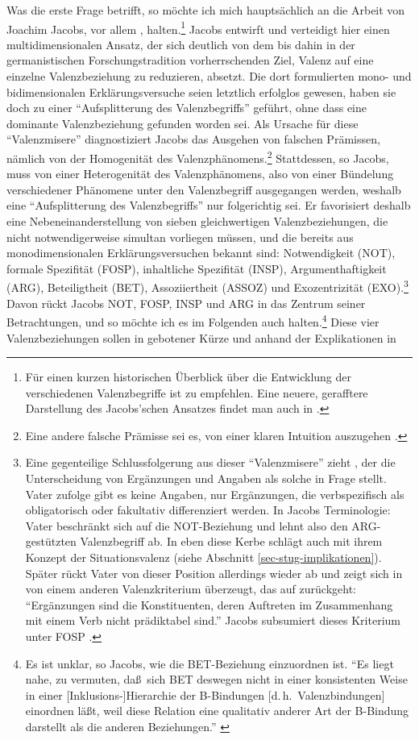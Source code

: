 Was die erste Frage betrifft, so möchte ich mich hauptsächlich an die Arbeit von Joachim Jacobs, vor allem \cite{Jacobs:94}, halten.\footnote{Für einen kurzen historischen Überblick über die Entwicklung der verschiedenen Valenzbegriffe ist \citet[208-215]{Helbig:73} zu empfehlen. Eine neuere, gerafftere Darstellung des Jacobs'schen Ansatzes findet man auch in \citet[369ff]{Zifonun:03}.} Jacobs entwirft und verteidigt hier einen multidimensionalen Ansatz, der sich deutlich von dem bis dahin in der germanistischen Forschungstradition vorherrschenden Ziel, Valenz auf eine einzelne Valenzbeziehung zu reduzieren, absetzt. Die dort formulierten mono- und bidimensionalen Erklärungsversuche seien letztlich erfolglos gewesen, haben sie doch zu einer "`Aufsplitterung des Valenzbegriffs"' geführt, ohne dass eine dominante Valenzbeziehung gefunden worden sei. Als Ursache für diese "`Valenz\-misere"' diagnostiziert Jacobs das Ausgehen von falschen Prämissen, nämlich von der Homogenität des Valenzphänomens.\footnote{Eine andere falsche Prämisse sei es, von einer klaren Intuition auszugehen \cite[Fußnote 8]{Jacobs:94}.} Stattdessen, so Jacobs, muss von einer Heterogenität des Valenzphänomens, also von einer Bündelung verschiedener Phänomene unter den Valenzbegriff ausgegangen werden, weshalb eine "`Aufsplitterung des Valenzbegriffs"' nur folgerichtig sei. Er favorisiert deshalb eine Nebeneinanderstellung von sieben gleichwertigen Valenzbeziehungen, die nicht notwendigerweise simultan vorliegen müssen, und die bereits aus mo\-no\-dimensionalen Erklärungsversuchen bekannt sind: Notwendigkeit (NOT), formale Spezifität (FOSP), inhaltliche Spezifität (INSP), Argumenthaftigkeit (ARG), Beteiligtheit (BET), Assoziiertheit (ASSOZ) und Exozentrizität (EXO).\footnote{\label{fn-valenz-vater}Eine gegenteilige Schlussfolgerung aus dieser "`Valenzmisere"' zieht \cite{Vater:78}, der die Unterscheidung von Ergänzungen und Angaben als solche in Frage stellt. Vater zufolge gibt es keine Angaben, nur Ergänzungen, die verbspezifisch als obligatorisch oder fakultativ differenziert werden. In Jacobs Terminologie: Vater beschränkt sich auf die NOT-Beziehung und lehnt also den ARG-gestützten Valenzbegriff ab. In eben diese Kerbe schlägt auch \cite{Storrer:92} mit ihrem Konzept der Situationsvalenz (siehe Abschnitt \ref{sec-stug-implikationen}). Später rückt Vater von dieser Position allerdings wieder ab und zeigt sich in \citet[227]{Vater:81} von einem anderen Valenzkriterium überzeugt, das auf \cite{Hoehle:78} zurückgeht: "`Ergänzungen sind die Konstituenten, deren Auftreten im Zusammenhang mit einem Verb nicht prädiktabel sind."' Jacobs subsumiert dieses Kriterium unter FOSP \citep[44]{Jacobs:94}.} Davon rückt Jacobs NOT, FOSP, INSP und ARG in das Zentrum seiner Betrachtungen, und so möchte ich es im Folgenden auch halten.\footnote{Es ist unklar, so Jacobs, wie die BET-Beziehung einzuordnen ist. "`Es liegt nahe, zu vermuten, da\ss \ sich BET deswegen nicht in einer konsistenten Weise in einer [Inklusions-]Hierarchie der B-Bindungen [d.\,h.\ Valenzbindungen] einordnen lä\ss t, weil diese Relation eine qualitativ anderer Art der B-Bindung darstellt als die anderen Beziehungen."' \citep[66]{Jacobs:94}} Diese vier Valenzbeziehungen sollen in gebotener Kürze und anhand der Explikationen in 